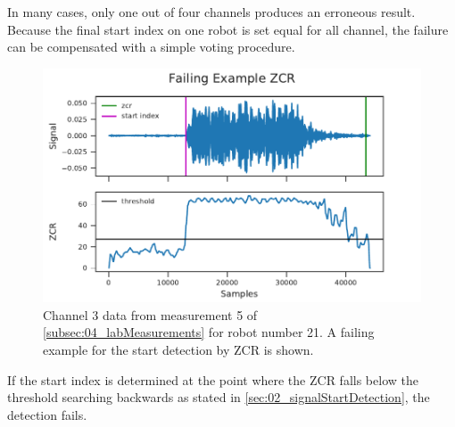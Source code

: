 In many cases, only one out of four channels produces an erroneous
result.
Because the final start index on one robot is set equal for all channel,
the failure can be compensated with a simple voting procedure.
\begin{figure}[ht]
	\centering
	\includegraphics[]{figures/evaluation/zcr_fail}
	\caption{Channel 3 data from measurement 5 of \cref{subsec:04_labMeasurements}
		for robot number 21. A failing example for the start detection by \ac{ZCR}
		is shown.}
	\label{fig:04_zcrFail}
\end{figure}
If the start index is determined at the point where the \ac{ZCR}
falls below the threshold searching backwards as stated in \cref{sec:02_signalStartDetection},
the detection fails.



